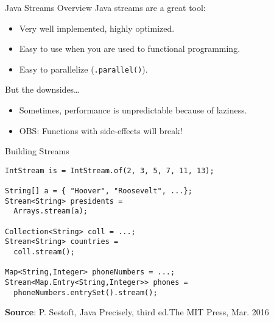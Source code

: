 \documentclass{beamer}
\begin{document}
\begin{frame}{Java Streams Overview}
  Java streams are a great tool:
  \begin{itemize}
  \item Very well implemented, highly optimized.
  \item Easy to use when you are used to functional programming.
  \item Easy to parallelize (\lstinline{.parallel()}).
  \end{itemize}

  \pause{} But the downsides\dots{}
  \begin{itemize}
  \item Sometimes, performance is unpredictable because of laziness.
  \item OBS: Functions with side-effects will break!
  \end{itemize}
\end{frame}

\begin{frame}[fragile]{Building Streams}
\begin{lstlisting}
IntStream is = IntStream.of(2, 3, 5, 7, 11, 13);

String[] a = { "Hoover", "Roosevelt", ...};
Stream<String> presidents =
  Arrays.stream(a);

Collection<String> coll = ...;
Stream<String> countries =
  coll.stream();

Map<String,Integer> phoneNumbers = ...;
Stream<Map.Entry<String,Integer>> phones =
  phoneNumbers.entrySet().stream();
\end{lstlisting}

\footnotesize{\textbf{Source}: P. Sestoft, Java Precisely, third ed.The MIT Press, Mar. 2016}
\end{frame}
\end{document}
